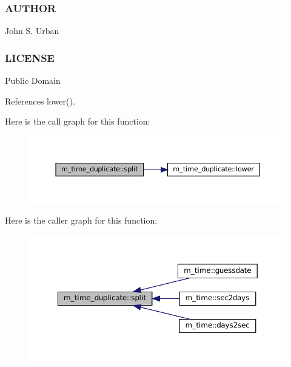 \subsubsection*{A\+U\+T\+H\+OR}

John S. Urban \subsubsection*{L\+I\+C\+E\+N\+SE}

Public Domain 

References lower().

Here is the call graph for this function\+:\nopagebreak
\begin{figure}[H]
\begin{center}
\leavevmode
\includegraphics[width=350pt]{namespacem__time__duplicate_a326e0d62d92969a231864997eea2ab98_cgraph}
\end{center}
\end{figure}
Here is the caller graph for this function\+:\nopagebreak
\begin{figure}[H]
\begin{center}
\leavevmode
\includegraphics[width=350pt]{namespacem__time__duplicate_a326e0d62d92969a231864997eea2ab98_icgraph}
\end{center}
\end{figure}
\mbox{\label{namespacem__time__duplicate_aaf5c25d7bce4f2776df6c1e586b2e277}} 
